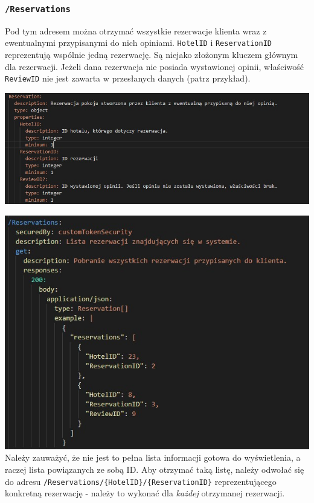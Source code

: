 \documentclass{article}
\begin{document}
\subsubsection{\texttt{/Reservations}}
Pod tym adresem można otrzymać wszystkie rezerwacje klienta wraz z ewentualnymi przypisanymi do nich opiniami. \texttt{HotelID} i \texttt{ReservationID} reprezentują wspólnie jedną rezerwację. Są niejako złożonym kluczem głównym dla rezerwacji. Jeżeli dana rezerwacja nie posiada wystawionej opinii, właściwość \texttt{ReviewID} nie jest zawarta w przesłanych danych (patrz przykład).

\includegraphics[width=\linewidth]{Rezerwacje/reservationType.jpg}

\includegraphics[width=\linewidth]{Rezerwacje/reservationsGET.jpg}
Należy zauważyć, że nie jest to pełna lista informacji gotowa do wyświetlenia, a raczej lista powiązanych ze sobą ID. Aby otrzymać taką listę, należy odwołać się do adresu \texttt{/Reservations/\{HotelID\}/\{ReservationID\}} reprezentującego konkretną rezerwację - należy to wykonać dla \textit{każdej} otrzymanej rezerwacji.
\end{document}
